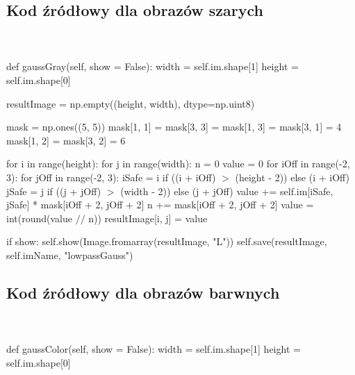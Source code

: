 \documentclass[final,a4paper,openany,12pt]{mwbk}
\begin{document}
\subsection*{Kod źródłowy dla obrazów szarych}
\hfill
\\\\
\noindent def gaussGray(self, show = False): \newline
\indent width = self.im.shape[1] \newline
\indent height = self.im.shape[0] \newline

resultImage = np.empty((height, width), dtype=np.uint8) \newline

mask = np.ones((5, 5)) \newline
\indent mask[1, 1] = mask[3, 3] = mask[1, 3] = mask[3, 1] = 4 \newline
\indent mask[1, 2] = mask[3, 2] = 6 \newline

for i in range(height): \newline
\indent for j in range(width): \newline
\indent n = 0 \newline
\indent value = 0 \newline
\indent for iOff in range(-2, 3): \newline
\indent for jOff in range(-2, 3): \newline
\indent iSafe = i if ((i + iOff) $>$ (height - 2)) else (i + iOff) \newline
\indent jSafe = j if ((j + jOff) $>$ (width - 2)) else (j + jOff) \newline
\indent value += self.im[iSafe, jSafe] * mask[iOff + 2, jOff + 2] \newline
\indent n += mask[iOff + 2, jOff + 2] \newline
\indent value = int(round(value $//$ n)) \newline
\indent resultImage[i, j] = value \newline

if show: \newline
\indent self.show(Image.fromarray(resultImage, "L")) \newline
\indent self.save(resultImage, self.imName, "lowpassGauss") \newline
\newpage

\subsection*{Kod źródłowy dla obrazów barwnych}
\hfill
\\\\
\noindent def gaussColor(self, show = False): \newline
\indent width = self.im.shape[1] \newline
\indent height = self.im.shape[0] \newline
\end{document}
